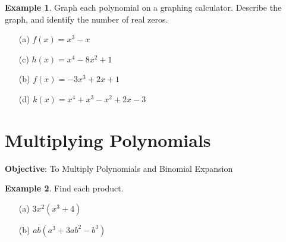 \documentclass{report}
\theoremstyle{definition}
\newtheorem{example}{\bf Example}
\begin{document}
\begin{example}
Graph each polynomial on a graphing calculator. Describe the graph, and identify the number of real zeros.
\end{example}


\begin{minipage}[t]{0.45\linewidth}
	\begin{itemize}
		\item[(a)] $f(x)=x^3-x$
		\vspace{1cm}
		\item[(c)] $h(x)=x^4-8x^2+1$
	\end{itemize}
\end{minipage}
\begin{minipage}[t]{0.45\linewidth}
	\begin{itemize}
		\item[(b)] $f(x)=-3x^3+2x+1$
		\vspace{1cm}
		\item[(d)] $k(x)=x^4+x^3-x^2+2x-3$
	\end{itemize}
\end{minipage}
\vfill


 \noindent{} \hfill 

 \newpage

 \section{ Multiplying Polynomials }
 \indent\hfill\small\noindent \textbf{Objective}: To Multiply Polynomials and Binomial Expansion\normalsize\\
 \setcounter{example}{0}
 \setcounter{definition}{0}

\vspace{-0.5cm}

 \begin{example}
  Find each product.
 \end{example}
\begin{minipage}[t]{0.45\linewidth}
	\begin{itemize}
		\item[(a)] $3x^2(x^3+4)$
	\end{itemize}
\end{minipage}
\begin{minipage}[t]{0.45\linewidth}
	\begin{itemize}
		\item[(b)] $ab(a^3+3ab^2-b^3)$
	\end{itemize}
\end{minipage}
\end{document}
